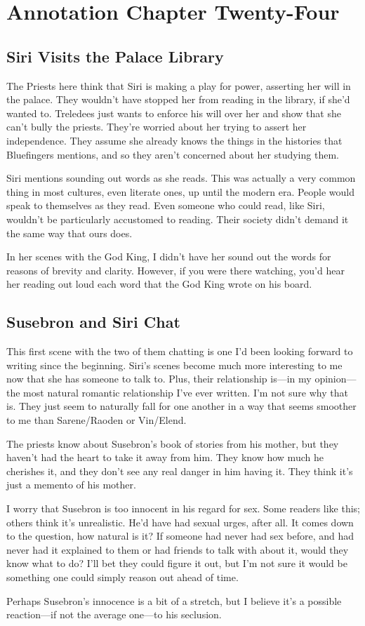 \section{Annotation Chapter Twenty-Four}

\subsection*{Siri Visits the Palace Library}

The Priests here think that Siri is making a play for power, asserting her will in the palace. They wouldn’t have stopped her from reading in the library, if she’d wanted to. Treledees just wants to enforce his will over her and show that she can’t bully the priests. They’re worried about her trying to assert her independence. They assume she already knows the things in the histories that Bluefingers mentions, and so they aren’t concerned about her studying them.

Siri mentions sounding out words as she reads. This was actually a very common thing in most cultures, even literate ones, up until the modern era. People would speak to themselves as they read. Even someone who could read, like Siri, wouldn’t be particularly accustomed to reading. Their society didn’t demand it the same way that ours does.

In her scenes with the God King, I didn’t have her sound out the words for reasons of brevity and clarity. However, if you were there watching, you’d hear her reading out loud each word that the God King wrote on his board.

\subsection*{Susebron and Siri Chat}

This first scene with the two of them chatting is one I’d been looking forward to writing since the beginning. Siri’s scenes become much more interesting to me now that she has someone to talk to. Plus, their relationship is—in my opinion—the most natural romantic relationship I’ve ever written. I’m not sure why that is. They just seem to naturally fall for one another in a way that seems smoother to me than Sarene/Raoden or Vin/Elend.

The priests know about Susebron’s book of stories from his mother, but they haven’t had the heart to take it away from him. They know how much he cherishes it, and they don’t see any real danger in him having it. They think it’s just a memento of his mother.

I worry that Susebron is too innocent in his regard for sex. Some readers like this; others think it’s unrealistic. He’d have had sexual urges, after all. It comes down to the question, how natural is it? If someone had never had sex before, and had never had it explained to them or had friends to talk with about it, would they know what to do? I’ll bet they could figure it out, but I’m not sure it would be something one could simply reason out ahead of time.

Perhaps Susebron’s innocence is a bit of a stretch, but I believe it’s a possible reaction—if not the average one—to his seclusion.



